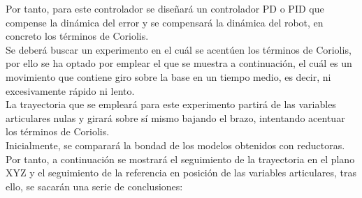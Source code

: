 Por tanto, para este controlador se diseñará un controlador PD o PID que compense la dinámica del error y se compensará la dinámica del robot, en concreto los términos de Coriolis.\\



Se deberá buscar un experimento en el cuál se acentúen los términos de Coriolis, por ello se ha optado por emplear el que se muestra a continuación, el cuál es un movimiento que contiene giro sobre la base en un tiempo medio, es decir, ni excesivamente rápido ni lento. \\

La trayectoria que se empleará para este experimento partirá de las variables articulares nulas y girará sobre sí mismo bajando el brazo, intentando acentuar los términos de Coriolis.\\



Inicialmente, se comparará la bondad de los modelos obtenidos con reductoras. Por tanto, a continuación se mostrará el seguimiento de la trayectoria en el plano XYZ y el seguimiento de la referencia en posición de las variables articulares, tras ello, se sacarán una serie de conclusiones:

